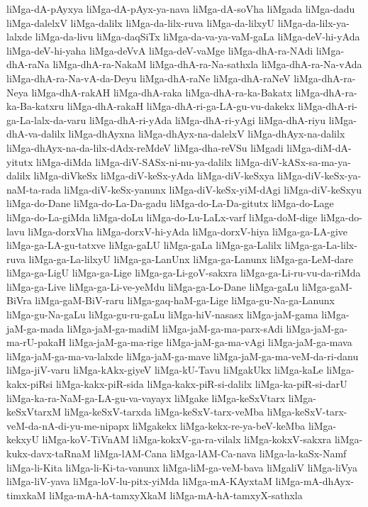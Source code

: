 {liMga-dA-pAyxya
liMga-dA-pAyx-ya-nava
liMga-dA-soVha
liMgada
liMga-dadu
liMga-dalelxV
liMga-dalilx
liMga-da-lilx-ruva
liMga-da-lilxyU
liMga-da-lilx-ya-lalxde
liMga-da-livu
liMga-daqSiTx
liMga-da-va-ya-vaM-gaLa
liMga-deV-hi-yAda
liMga-deV-hi-yaha
liMga-deVvA
liMga-deV-vaMge
liMga-dhA-ra-NAdi
liMga-dhA-raNa
liMga-dhA-ra-NakaM
liMga-dhA-ra-Na-sathxla
liMga-dhA-ra-Na-vAda
liMga-dhA-ra-Na-vA-da-Deyu
liMga-dhA-raNe
liMga-dhA-raNeV
liMga-dhA-ra-Neya
liMga-dhA-rakAH
liMga-dhA-raka
liMga-dhA-ra-ka-Bakatx
liMga-dhA-ra-ka-Ba-katxru
liMga-dhA-rakaH
liMga-dhA-ri-ga-LA-gu-vu-dakekx
liMga-dhA-ri-ga-La-lalx-da-varu
liMga-dhA-ri-yAda
liMga-dhA-ri-yAgi
liMga-dhA-riyu
liMga-dhA-va-dalilx
liMga-dhAyxna
liMga-dhAyx-na-dalelxV
liMga-dhAyx-na-dalilx
liMga-dhAyx-na-da-lilx-dAdx-reMdeV
liMga-dha-reVSu
liMgadi
liMga-diM-dA-yitutx
liMga-diMda
liMga-diV-SASx-ni-nu-ya-dalilx
liMga-diV-kASx-sa-ma-ya-dalilx
liMga-diVkeSx
liMga-diV-keSx-yAda
liMga-diV-keSxya
liMga-diV-keSx-ya-naM-ta-rada
liMga-diV-keSx-yanunx
liMga-diV-keSx-yiM-dAgi
liMga-diV-keSxyu
liMga-do-Dane
liMga-do-La-Da-gadu
liMga-do-La-Da-gitutx
liMga-do-Lage
liMga-do-La-giMda
liMga-doLu
liMga-do-Lu-LaLx-varf
liMga-doM-dige
liMga-do-lavu
liMga-dorxVha
liMga-dorxV-hi-yAda
liMga-dorxV-hiya
liMga-ga-LA-give
liMga-ga-LA-gu-tatxve
liMga-gaLU
liMga-gaLa
liMga-ga-Lalilx
liMga-ga-La-lilx-ruva
liMga-ga-La-lilxyU
liMga-ga-LanUnx
liMga-ga-Lanunx
liMga-ga-LeM-dare
liMga-ga-LigU
liMga-ga-Lige
liMga-ga-Li-goV-sakxra
liMga-ga-Li-ru-vu-da-riMda
liMga-ga-Live
liMga-ga-Li-ve-yeMdu
liMga-ga-Lo-Dane
liMga-gaLu
liMga-gaM-BiVra
liMga-gaM-BiV-raru
liMga-gaq-haM-ga-Lige
liMga-gu-Na-ga-Lanunx
liMga-gu-Na-gaLu
liMga-gu-ru-gaLu
liMga-hiV-nasasx
liMga-jaM-gama
liMga-jaM-ga-mada
liMga-jaM-ga-madiM
liMga-jaM-ga-ma-parx-sAdi
liMga-jaM-ga-ma-rU-pakaH
liMga-jaM-ga-ma-rige
liMga-jaM-ga-ma-vAgi
liMga-jaM-ga-mava
liMga-jaM-ga-ma-va-lalxde
liMga-jaM-ga-mave
liMga-jaM-ga-ma-veM-da-ri-danu
liMga-jiV-varu
liMga-kAkx-giyeV
liMga-kU-Tavu
liMgakUkx
liMga-kaLe
liMga-kakx-piRsi
liMga-kakx-piR-sida
liMga-kakx-piR-si-dalilx
liMga-ka-piR-si-darU
liMga-ka-ra-NaM-ga-LA-gu-va-vayayx
liMgake
liMga-keSxVtarx
liMga-keSxVtarxM
liMga-keSxV-tarxda
liMga-keSxV-tarx-veMba
liMga-keSxV-tarx-veM-da-nA-di-yu-me-nipapx
liMgakekx
liMga-kekx-re-ya-beV-keMba
liMga-kekxyU
liMga-koV-TiVnAM
liMga-kokxV-ga-ra-vilalx
liMga-kokxV-sakxra
liMga-kukx-davx-taRnaM
liMga-lAM-Cana
liMga-lAM-Ca-nava
liMga-la-kaSx-Namf
liMga-li-Kita
liMga-li-Ki-ta-vanunx
liMga-liM-ga-veM-bava
liMgaliV
liMga-liVya
liMga-liV-yava
liMga-loV-lu-pitx-yiMda
liMga-mA-KAyxtaM
liMga-mA-dhAyx-timxkaM
liMga-mA-hA-tamxyXkaM
liMga-mA-hA-tamxyX-sathxla
}
